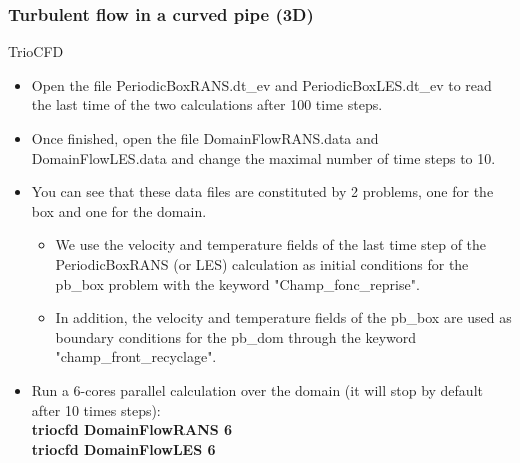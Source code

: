 \documentclass[10pt, hyperref={unicode=true,pdfusetitle, bookmarks=true,bookmarksnumbered=false,bookmarksopen=false, breaklinks=false,pdfborder={0 0 1},backref=true,colorlinks=true,linkcolor=darkblue,pageanchor}]{beamer}
\begin{document}
\begin{frame}
\frametitle{Turbulent flow in a curved pipe (3D)}
\begin{block}{TrioCFD}

\begin{itemize}
\item Open the file PeriodicBoxRANS.dt\_ev and PeriodicBoxLES.dt\_ev to read the last time of the two calculations after 100 time steps.

\item Once finished, open the file DomainFlowRANS.data and DomainFlowLES.data and change the maximal number of time steps to 10.

\item You can see that these data files are constituted by 2 problems, one for the box and one for the domain.
    \begin {itemize}
    \item We use the velocity and temperature fields of the last time step of the PeriodicBoxRANS (or LES) calculation as initial conditions for the pb\_box problem with the keyword "Champ\_fonc\_reprise".
    \item In addition, the velocity and temperature fields of the pb\_box are used as boundary conditions for the pb\_dom through the keyword "champ\_front\_recyclage".
    \end{itemize}

\item Run a 6-cores parallel calculation over the domain (it will stop by default after 10 times steps):\\
\textbf{triocfd DomainFlowRANS 6}\\
\textbf{triocfd DomainFlowLES 6}

\end{itemize}

\end{block}
\end{frame}
\end{document}
